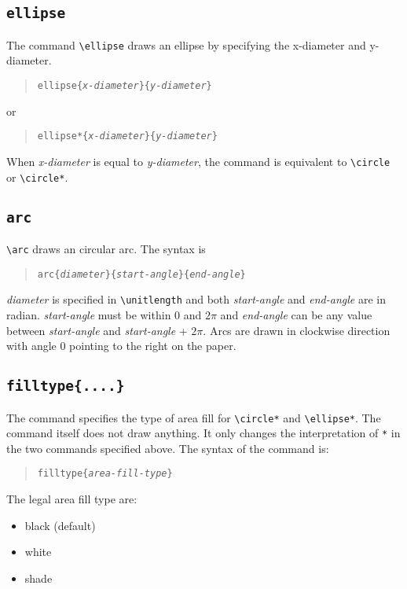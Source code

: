 \subsection{\tt \BS ellipse}
The command \verb|\ellipse| draws an ellipse by specifying the
x-diameter and y-diameter.
\begin{quote}
\begin{alltt}
\BS{}ellipse\{{\em{}x-diameter}\}\{{\em{}y-diameter}\}
\end{alltt}
\end{quote}
or
\begin{quote}
\begin{alltt}
\BS{}ellipse*\{{\em{}x-diameter}\}\{{\em{}y-diameter}\}
\end{alltt}
\end{quote}
When {\em x-diameter} is equal to {\em y-diameter}, the command
is equivalent to \verb|\circle| or \verb|\circle*|.


\subsection{\tt \BS arc}
\verb|\arc| draws an circular arc. The syntax is
\begin{quote}
\begin{alltt}
\BS{}arc\{{\em{}diameter}\}\{{\em{}start-angle}\}\{{\em{}end-angle}\}
\end{alltt}
\end{quote}
{\em diameter} is specified in \verb|\unitlength| and both {\em
start-angle} and {\em end-angle} are in radian. {\em start-angle}
must be within 0 and $2\pi$ and {\em end-angle} can be any value
between {\em start-angle} and {\em start-angle} + $2\pi$. Arcs
are drawn in clockwise direction with angle 0 pointing to the
right on the paper.


\subsection{\tt \BS filltype\{....\}}
The command specifies the type of area fill for \verb|\circle*| and
\verb|\ellipse*|. The command itself does not draw anything. 
It only changes the interpretation of \verb|*| in the two commands
specified above.
The syntax of the command is:
\begin{quote}
\begin{alltt}
\BS{}filltype\{{\em{}area-fill-type}\}
\end{alltt}
\end{quote}
The legal area fill type are:
\begin{itemize}
\item black (default)
\item white
\item shade
\end{itemize}

